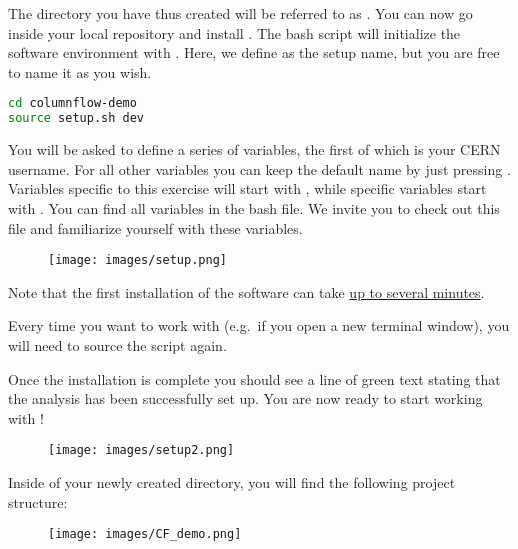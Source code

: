 The directory you have thus created will be referred to as . You can now go inside your local repository and install \columnflow. The  bash script will initialize the software environment with . Here, we define  as the setup name, but you are free to name it as you wish.

\begin{lstlisting}[language=bash]
cd columnflow-demo
source setup.sh dev
\end{lstlisting}


You will be asked to define a series of variables, the first of which is your CERN username.
For all other variables you can keep the default name by just pressing .
Variables specific to this exercise will start with , while \columnflow specific variables start with .
You can find all variables in the  bash file.
We invite you to check out this file and familiarize yourself with these variables.


\begin{figure}[!h]
    \centering
    \texttt{[image: images/setup.png]}
\end{figure}

Note that the first installation of the software can take \underline{up to several minutes}.

Every time you want to work with \columnflow (e.g.\ if you open a new terminal window), you will need to source the  script again.


Once the installation is complete you should see a line of green text stating that the analysis has been successfully set up. You are now ready to start working with \columnflow! 


\begin{figure}[!h]
    \centering
    \texttt{[image: images/setup2.png]}
\end{figure}

Inside of your newly created  directory, you will find the following project structure:
\begin{figure}[!h]
    \centering
    \texttt{[image: images/CF\_demo.png]}
\end{figure}



